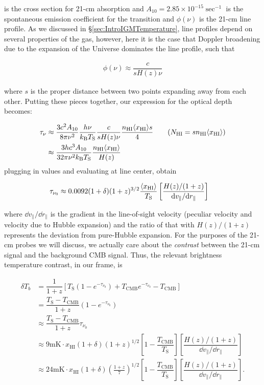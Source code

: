 is the cross section for 21-cm absorption and $A_{10} = 2.85 \times 10^{-15}\sec^{-1}$ is the spontaneous emission coefficient for the transition and $\phi(\nu)$ is the 21-cm line profile. As we discussed in \S \ref{sec:IntroIGMTemperature}, line profiles depend on several properties of the gas, however, here it is the case that Doppler broadening due to the expansion of the Universe dominates the line profile, such that

\begin{align}
\phi(\nu) \approx \dfrac{c}{s H(z) \nu}
\end{align}

where $s$ is the proper distance between two points expanding away from each other. Putting these pieces together, our expression for the optical depth becomes:

\begin{align}
\tau_{\nu} &\approx \dfrac{3c^2 A_{10}}{8\pi \nu^{2}} \dfrac{h \nu}{k_{\text{B}}T_{\text{S}}} \dfrac{c}{s H(z) \nu} \dfrac{n_{\text{HI}}\langle x_{\text{HI}}\rangle s}{4} \tag{$N_{\text{HI}} = s n_{\text{HI}}\axhi$}\\
&\approx \dfrac{3hc^3 A_{10}}{32\pi \nu^2 k_{\text{B}}T_{\text{S}}} \dfrac{n_{\text{HI}}\axhi}{H(z)}
\end{align}
plugging in values and evaluating at line center, \cite{Furlanetto2006} obtain

\begin{align}
\tau_{\nu_{0}} &\approx 0.0092 (1+\delta)(1+z)^{3/2}\dfrac{\langle x_{\text{HI}}\rangle}{T_{\text{S}}}\left[ \dfrac{H(z)/(1+z)}{\text{d} v_{\parallel}/\text{d} r_{\parallel}} \right] 
\end{align}

where $\dd v_{\parallel}/\dd r_{\parallel}$ is the gradient in the line-of-sight velocity (peculiar velocity and velocity due to Hubble expansion) and the ratio of that with $H(z)/(1+z)$ represents the deviation from pure-Hubble expansion. For the purposes of the 21-cm probes we will discuss, we actually care about the \textit{contrast} between the 21-cm signal and the background CMB signal. Thus, the relevant brightness temperature contrast, in our frame, is 

\begin{align}
\delta T_{b} &= \dfrac{1}{1+z}\left[ T_{\text{S}}(1-e^{-\tau_{\nu_{0}}}) + T_{\text{CMB}}e^{-\tau_{\nu_{0}}} - T_{\text{CMB}} \right] \\
&= \dfrac{T_{\text{S}}-T_{\text{CMB}}}{1+z} (1 - e^{-\tau_{\nu_{0}}}) \\
&\approx \dfrac{T_{\text{S}}-T_{\text{CMB}}}{1+z} \tau_{\nu_{0}} \\ 
&\approx 9\text{mK}\cdot x_{\text{HI}}(1+\delta)(1+z)^{1/2}\left[ 1 - \dfrac{T_{\text{CMB}}}{T_{\text{S}}} \right] \left[ \dfrac{H(z)/(1+z)}{\dd v_{\parallel}/ \dd r_{\parallel}} \right] \\ 
&\approx 24 \text{mK}\cdot x_{\text{HI}}(1+\delta)\left(\frac{1+z}{7}\right)^{1/2}\left[ 1 - \dfrac{T_{\text{CMB}}}{T_{\text{S}}} \right] \left[ \dfrac{H(z)/(1+z)}{\dd v_{\parallel}/ \dd r_{\parallel}} \right]. \label{eq:dTb}
\end{align}

